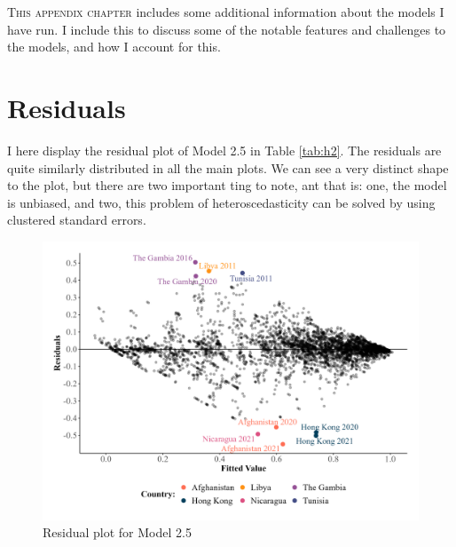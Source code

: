 \lettrine{T}{his appendix chapter} includes some additional information about the models I have run. I include this to discuss some of the notable features and challenges to the models, and how I account for this.

\section{Residuals}
I here display the residual plot of Model 2.5 in Table \ref{tab:h2}. The residuals are quite similarly distributed in all the main plots. We can see a very distinct shape to the plot, but there are two important ting to note, ant that is: one, the model is unbiased, and two, this problem of heteroscedasticity can be solved by using clustered standard errors.

\begin{figure}
    \centering
    \includegraphics[width=\linewidth]{graphics/residuals.jpeg}
    \caption{Residual plot for Model 2.5}
    \label{fig:residuals}
\end{figure}